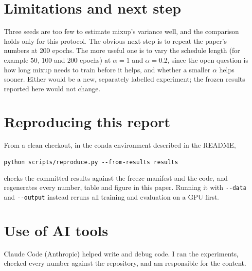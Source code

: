 \documentclass[conference]{IEEEtran}
\begin{document}
\section{Limitations and next step}
Three seeds are too few to estimate mixup's variance well, and the comparison holds only for this
protocol. The obvious next step is to repeat the paper's numbers at 200 epochs. The more useful one
is to vary the schedule length (for example 50, 100 and 200 epochs) at $\alpha=1$ and $\alpha=0.2$,
since the open question is how long mixup needs to train before it helps, and whether a smaller
$\alpha$ helps sooner. Either would be a new, separately labelled experiment; the frozen results
reported here would not change.

\section*{Reproducing this report}
From a clean checkout, in the conda environment described in the README,
\begin{center}
\footnotesize\verb|python scripts/reproduce.py --from-results results|
\end{center}
checks the committed results against the freeze manifest and the code, and regenerates every
number, table and figure in this paper. Running it with \verb|--data| and \verb|--output| instead
reruns all training and evaluation on a GPU first.

\section*{Use of AI tools}
Claude Code (Anthropic) helped write and debug code. I ran the experiments,
checked every number against the repository, and am responsible for the content.



\end{document}
